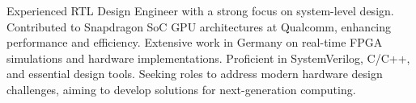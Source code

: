 \begin{cvSummary}
Experienced RTL Design Engineer with a strong focus on system-level design. Contributed to Snapdragon SoC GPU architectures at Qualcomm, enhancing performance and efficiency. Extensive work in Germany on real-time FPGA simulations and hardware implementations. Proficient in SystemVerilog, C/C++, and essential design tools. Seeking roles to address modern hardware design challenges, aiming to develop solutions for next-generation computing.
\end{cvSummary}    